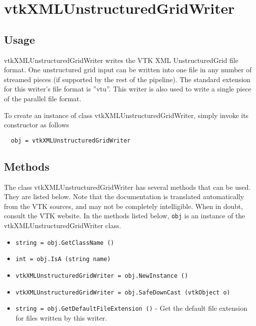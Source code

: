 \section{vtkXMLUnstructuredGridWriter}

\subsection{Usage}

 vtkXMLUnstructuredGridWriter writes the VTK XML UnstructuredGrid
 file format.  One unstructured grid input can be written into one
 file in any number of streamed pieces (if supported by the rest of
 the pipeline).  The standard extension for this writer's file
 format is ''vtu''.  This writer is also used to write a single piece
 of the parallel file format.

To create an instance of class vtkXMLUnstructuredGridWriter, simply
invoke its constructor as follows
\begin{verbatim}
  obj = vtkXMLUnstructuredGridWriter
\end{verbatim}
\subsection{Methods}

The class vtkXMLUnstructuredGridWriter has several methods that can be used.
  They are listed below.
Note that the documentation is translated automatically from the VTK sources,
and may not be completely intelligible.  When in doubt, consult the VTK website.
In the methods listed below, \verb|obj| is an instance of the vtkXMLUnstructuredGridWriter class.
\begin{itemize}
\item  \verb|string = obj.GetClassName ()|

\item  \verb|int = obj.IsA (string name)|

\item  \verb|vtkXMLUnstructuredGridWriter = obj.NewInstance ()|

\item  \verb|vtkXMLUnstructuredGridWriter = obj.SafeDownCast (vtkObject o)|

\item  \verb|string = obj.GetDefaultFileExtension ()| -  Get the default file extension for files written by this writer.

\end{itemize}
